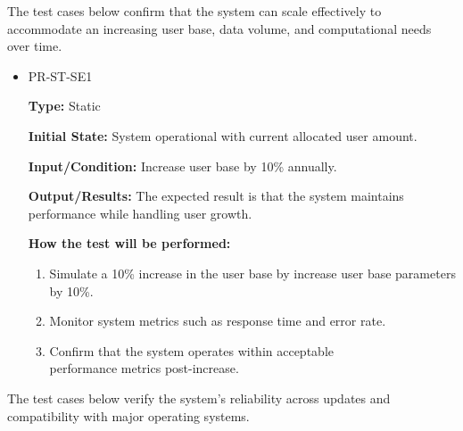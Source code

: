 \documentclass[12pt, titlepage]{article}
\begin{document}
\hspace{2em}The test cases below confirm that the system can scale effectively to 
accommodate an increasing user base, data volume, and computational needs over time. 

\begin{itemize}
  \item PR-ST-SE1
  \begin{mdframed}[linewidth=0.5mm]
      \textbf{Type:} Static \par
      \textbf{Initial State:} System operational with current allocated user amount. \par
      \textbf{Input/Condition:} Increase user base by 10\% annually. \par
      \textbf{Output/Results:} The expected result is that the system maintains performance while handling user growth. \par
      \textbf{How the test will be performed:}
      \begin{enumerate}[noitemsep]
        \item Simulate a 10\% increase in the user base by increase user base parameters by 10\%.
        \item Monitor system metrics such as response time and error rate.
        \item Confirm that the system operates within acceptable \\performance metrics post-increase.
      \end{enumerate}
  \end{mdframed}
\end{itemize}

\hspace{2em}The test cases below verify the system’s reliability across updates and 
compatibility with major operating systems. 
\end{document}
